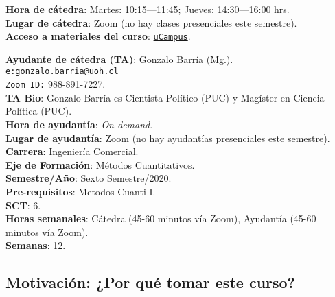 \documentclass[letterpaper]{article}
\begin{document}
\vspace{5mm}
{\bf Hora de c\'atedra}: Martes: 10:15---11:45; Jueves: 14:30---16:00 hrs.\\
{\bf Lugar de c\'atedra}: Zoom (no hay clases presenciales este semestre).\\

{\bf Acceso a materiales del curso}: \href{https://ucampus.uoh.cl/uoh/2020/2/ICE3202/1/}{\texttt{uCampus}}.

\vspace{5mm}
{\bf Ayudante de c\'atedra (TA)}: Gonzalo Barr\'ia (Mg.).\\
\texttt{e:}\href{mailto:gonzalo.barria@uoh.cl}{\texttt{gonzalo.barria@uoh.cl}}\\
\texttt{Zoom ID:} 988-891-7227.\\
{\bf TA Bio}: Gonzalo Barr\'ia es Cientista Pol\'itico (PUC) y Mag\'ister en Ciencia Pol\'itica (PUC).\\
{\bf Hora de ayudant\'ia}: \emph{On-demand}.\\
{\bf Lugar de ayudant\'ia}: Zoom (no hay ayudant\'ias presenciales este semestre).\\


\vspace{5mm}
{\bf Carrera}:  Ingenier\'ia Comercial.\\
{\bf Eje de Formaci\'on}: M\'etodos Cuantitativos.\\
{\bf Semestre/A\~no}: Sexto Semestre/2020.\\
{\bf Pre-requisitos}: Metodos Cuanti I.\\
{\bf SCT}: 6.\\
{\bf Horas semanales}: C\'atedra (45-60 minutos v\'ia Zoom), Ayudant\'ia  (45-60 minutos v\'ia Zoom). \\
{\bf Semanas}:  12.



\subsection*{Motivaci\'on: ¿Por qu\'e tomar este curso?}
\end{document}

